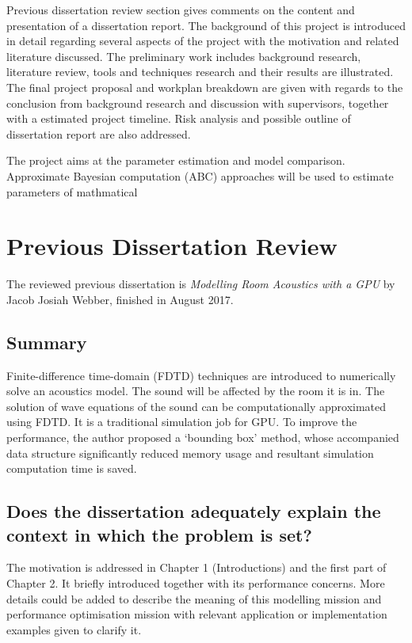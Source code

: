\documentclass{article}
\begin{document}
Previous dissertation review section gives comments on the content 
and presentation of a dissertation report. The background of this project is 
introduced in detail regarding several aspects of the project with the motivation
and related literature discussed. 
The preliminary work includes background 
research, literature review, tools and techniques research and their results 
are illustrated. The final project 
proposal and workplan breakdown are given with regards to the conclusion from 
background research and discussion with supervisors, together with a 
estimated project timeline. Risk analysis and possible 
outline of dissertation report are also addressed.

The project aims at the parameter estimation and model comparison. Approximate 
Bayesian computation (ABC) approaches will be used to estimate parameters of mathmatical 

\section{Previous Dissertation Review}

The reviewed previous dissertation is {\em Modelling Room Acoustics with a 
GPU} by Jacob Josiah Webber, finished in August 2017.
\subsection*{Summary}

Finite-difference time-domain (FDTD) techniques are introduced to numerically solve an acoustics model. The sound will be affected by the room it is in. The solution of wave equations of the sound can be computationally approximated using FDTD. It is a traditional simulation job for GPU. To improve the performance, the author proposed a ‘bounding box’ method, whose accompanied data structure significantly reduced memory usage and resultant simulation computation time is saved.

\subsection*{Does the dissertation adequately explain the context in which the problem is set?}

The motivation is addressed in Chapter 1 (Introductions) and the first part of Chapter 2. It briefly introduced together with its performance concerns. More details could be added to describe the meaning of this modelling mission and performance optimisation mission with relevant application or implementation examples given to clarify it.
\end{document}
